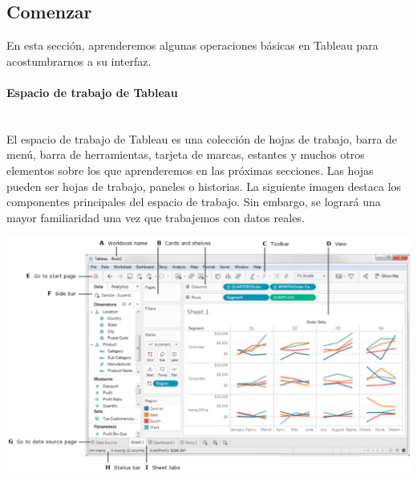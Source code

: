 \documentclass[12pt,letterpaper]{article}
\begin{document}
    \subsection{Comenzar}
    En esta sección, aprenderemos algunas operaciones básicas en Tableau para acostumbrarnos a su interfaz.
    \paragraph{\large Espacio de trabajo de Tableau \\ \\}
    El espacio de trabajo de Tableau es una colección de hojas de trabajo, barra de menú, barra de herramientas, tarjeta de marcas, estantes y muchos otros elementos sobre los que aprenderemos en las próximas secciones. Las hojas pueden ser hojas de trabajo, paneles o historias. La siguiente imagen destaca los componentes principales del espacio de trabajo. Sin embargo, se logrará una mayor familiaridad una vez que trabajemos con datos reales.
    \begin{center}
        \includegraphics[width=16cm]{./img/img2.png}
    \end{center}
\end{document}
